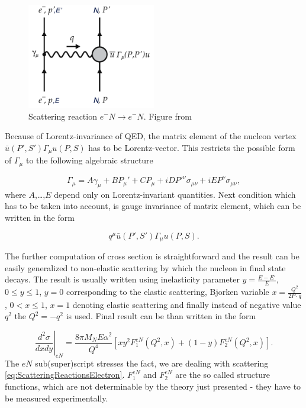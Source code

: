 \documentclass[a4paper,11pt]{report}
\begin{document}
\begin{figure}[t]
  \centering
  \includegraphics[width=0.5\textwidth]{Chapter1/Scattering.png} 
  \caption{Scattering reaction $e^-N \rightarrow e^-N$. Figure from
    \cite{QCDTextbook}}
  \label{fig:Scattering}
\end{figure}

Because of Lorentz-invariance of QED, the matrix element of the nucleon vertex
$\bar{u}(P',S')\Gamma_\mu u(P,S)$ has to be Lorentz-vector. This restricts
the possible form of $\Gamma_\mu$ to the following algebraic structure

\begin{equation}
  \Gamma_\mu = A \gamma_\mu + B P_\mu' + C P_\mu + i D P'^\nu \sigma_{\mu\nu}
    + i E P^\nu \sigma_{\mu\nu},
  \label{eq:ScatteringAlgebraicMatrix}
\end{equation}
where $A$,\dots,$E$ depend only on Lorentz-invariant quantities. Next condition
which has to be taken into account, is gauge invariance of matrix element, which
can be written in the form

\begin{equation}
  q^\mu \bar{u}(P',S')\Gamma_\mu u(P,S).
  \label{eq:ScatteringGaugeInvariance}
\end{equation}

The further computation of cross section is straightforward and the result can
be easily generalized to non-elastic scattering by which the nucleon in final
state decays. The result is usually written using inelasticity parameter
$y=\frac{E-E'}{E}$, $0 \leq y \leq 1$, $y=0$ corresponding to the elastic
scattering, Bjorken variable $ x = \frac{Q^2}{2 P \cdot q}$, $ 0 < x \leq 1$, $x
= 1$ denoting elastic scattering and finally instead of negative value $q^2$ the
$Q^2 = -q^2$ is used. Final result can be than written in the form

\begin{equation}
  \left. \frac{d^2\sigma}{dxdy} \right|_{eN} =
  \frac{8 \pi M_N E \alpha^2}{Q^4} \left[ x y^2 F_1^{eN}(Q^2, x)
  + (1-y) F_2^{eN}(Q^2,x) \right].
  \label{eq:ScatteringRes1}
\end{equation}
The $eN$ sub(super)script stresses the fact, we are dealing with scattering
\eqref{eq:ScatteringReactionsElectron}. $F_1^{eN}$ and $F_2^{eN}$ are the so
called structure functions, which are not determinable by the theory just
presented - they have to be measured experimentally.
\end{document}
